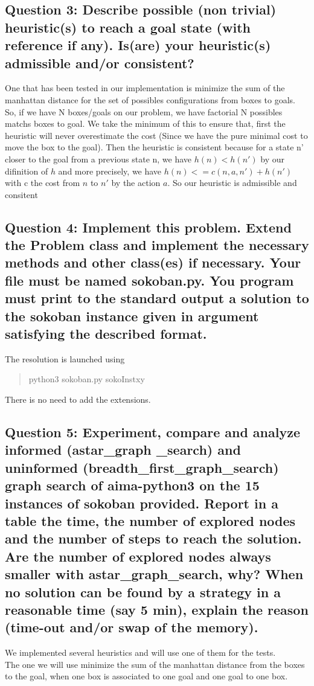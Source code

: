 \documentclass[a4paper,10pt]{article}
\begin{document}
		\subsection{Question 3: Describe possible (non trivial) heuristic(s) to reach a goal state (with reference if any). Is(are) your heuristic(s) admissible and/or consistent?}
		
		One that has been tested in our implementation is minimize the sum of the manhattan distance for the set of possibles configurations from boxes to goals. \\
		So, if we have N boxes/goals on our problem, we have factorial N possibles matchs boxes to goal. We take the minimum of this to ensure that, first the heuristic will never overestimate the cost (Since we have the pure minimal cost to move the box to the goal). Then the heuristic is consistent because for a state n' closer to the goal from a previous state n, we have $ h(n) < h(n')$ by our difinition of $h$ and more precisely, we have $h(n) <= c(n,a,n')+h(n')$ with c the cost from $n$ to $n'$ by the action $a$. So our heuristic is admissible and consitent
		\subsection{Question 4: Implement this problem. Extend the Problem class and implement the necessary methods and other class(es) if necessary. Your file must be named sokoban.py. You program must print to the standard output a solution to the sokoban instance given in argument satisfying the described format.}
			The resolution is launched using 
			\begin{quote}
				python3 sokoban.py sokoInstxy 
			\end{quote}
			There is no need to add the extensions.

		\subsection{Question 5: Experiment, compare and analyze informed (astar\_graph \_search) and uninformed (breadth\_first\_graph\_search) graph search of aima-python3 on the 15 instances of sokoban provided. Report in a table the time, the number of explored nodes and the number of steps to reach the solution. Are the number of explored nodes always smaller with astar\_graph\_search, why? When no solution can be found by a strategy in a reasonable time (say 5 min), explain the reason (time-out and/or swap of the memory).}
			We implemented several heuristics and will use one of them for the tests. \\
			The one we will use minimize the sum of the manhattan distance from the boxes to the goal, when one box is associated to one goal and one goal to one box.
			
\end{document}
